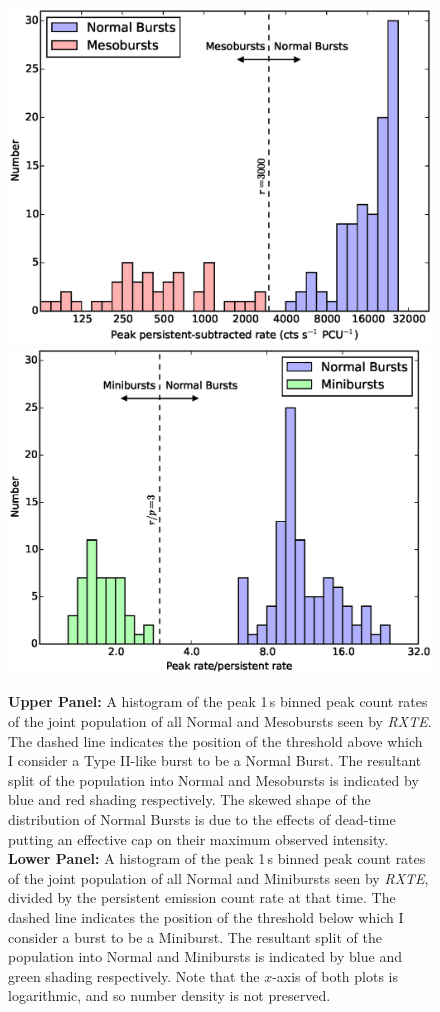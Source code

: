 \begin{figure}
  \centering
  \includegraphics[width=.8\linewidth, trim={1.3cm 0.4cm 2.0cm 0.8cm},clip]{images/norm_meso_sep.eps}
  \includegraphics[width=.8\linewidth, trim={1.3cm 0.4cm 2.0cm 0.8cm},clip]{images/norm_mini_sep.eps}
  \caption[Histogram of the peak 1\,s binned peak count rates during Normal Bursts, Mesobursts and Minibursts as seen by \textit{RXTE}]{\small \textbf{Upper Panel:} A histogram of the peak 1\,s binned peak count rates of the joint population of all Normal and Mesobursts seen by \textit{RXTE}.  The dashed line indicates the position of the threshold above which I consider a Type II-like burst to be a Normal Burst.  The resultant split of the population into Normal and Mesobursts is indicated by blue and red shading respectively.  The skewed shape of the distribution of Normal Bursts is due to the effects of dead-time putting an effective cap on their maximum observed intensity.
 \textbf{Lower Panel:} A histogram of the peak 1\,s binned peak count rates of the joint population of all Normal and Minibursts seen by \textit{RXTE}, divided by the persistent emission count rate at that time.  The dashed line indicates the position of the threshold below which I consider a burst to be a Miniburst.  The resultant split of the population into Normal and Minibursts is indicated by blue and green shading respectively.
  Note that the $x$-axis of both plots is logarithmic, and so number density is not preserved.}
  \label{fig:jointhist}
\end{figure}

